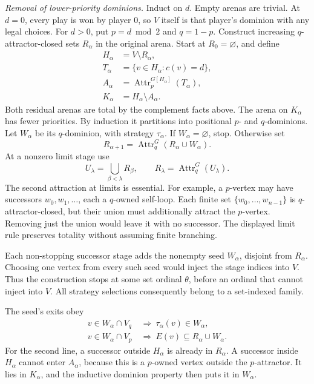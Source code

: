 \emph{Removal of lower-priority dominions.}
Induct on \(d\). Empty arenas are trivial.
At \(d=0\), every play is won by player
\(0\), so \(V\) itself is that player's
dominion with any legal choices.
For \(d>0\), put \(p=d\bmod2\) and
\(q=1-p\).
Construct increasing \(q\)-attractor-closed
sets \(R_\alpha\) in the original arena.
Start at \(R_0=\varnothing\), and define
\[
\begin{aligned}
 H_\alpha&=V\setminus R_\alpha,\\
 T_\alpha&=\{v\in H_\alpha:c(v)=d\},\\
 A_\alpha&=\operatorname{Attr}_p^{G[H_\alpha]}(T_\alpha),\\
 K_\alpha&=H_\alpha\setminus A_\alpha.
\end{aligned}
\]
Both residual arenas are total by the
complement facts above. The arena on
\(K_\alpha\) has fewer priorities.
By induction it partitions into positional
\(p\)- and \(q\)-dominions. Let \(W_\alpha\)
be its \(q\)-dominion, with strategy
\(\tau_\alpha\).
If \(W_\alpha=\varnothing\), stop.
Otherwise set
\[
 R_{\alpha+1}
   =\operatorname{Attr}_q^G(R_\alpha\cup W_\alpha).
\]
At a nonzero limit stage use
\[
 U_\lambda=\bigcup_{\beta<\lambda}R_\beta,
 \qquad
 R_\lambda=\operatorname{Attr}_q^G(U_\lambda).
\]
The second attraction at limits is essential.
For example, a \(p\)-vertex may have
successors \(w_0,w_1,\ldots\), each a
\(q\)-owned self-loop. Each finite set
\(\{w_0,\ldots,w_{n-1}\}\) is \(q\)-attractor-closed,
but their union must additionally attract
the \(p\)-vertex. Removing just the union
would leave it with no successor.
The displayed limit rule preserves totality
without assuming finite branching.

Each non-stopping successor stage adds
the nonempty seed \(W_\alpha\), disjoint
from \(R_\alpha\). Choosing one vertex
from every such seed would inject the
stage indices into \(V\).
Thus the construction stops at some
set ordinal \(\theta\), before an ordinal
that cannot inject into \(V\).
All strategy selections consequently
belong to a set-indexed family.

The seed's exits obey
\[
\begin{aligned}
 v\in W_\alpha\cap V_q
     &\ \Longrightarrow\ \tau_\alpha(v)\in W_\alpha,\\
 v\in W_\alpha\cap V_p
     &\ \Longrightarrow\ E(v)\subseteq R_\alpha\cup W_\alpha.
\end{aligned}
\]
For the second line, a successor outside
\(H_\alpha\) is already in \(R_\alpha\).
A successor inside \(H_\alpha\) cannot
enter \(A_\alpha\), because this is a
\(p\)-owned vertex outside the
\(p\)-attractor. It lies in \(K_\alpha\),
and the inductive dominion property
then puts it in \(W_\alpha\).

